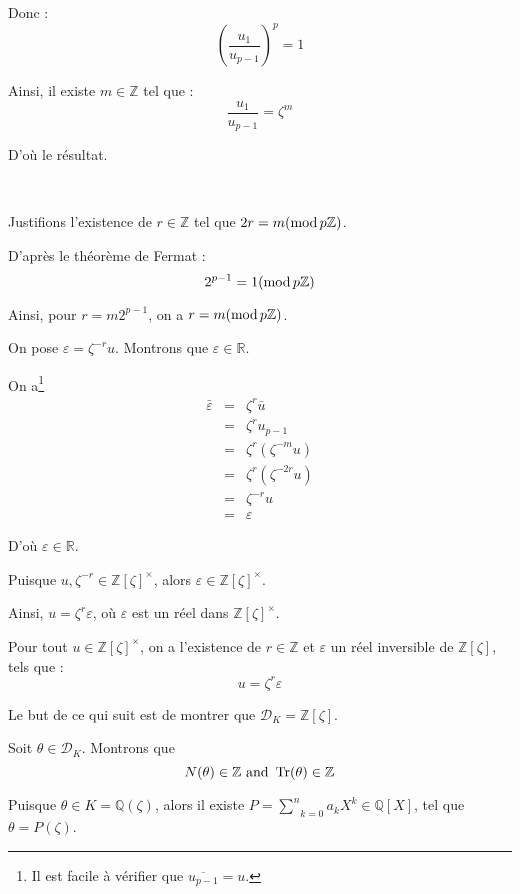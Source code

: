Donc :
\[ \left( \frac{u_1}{u_{p - 1}} \right)^p = 1 \]


Ainsi, il existe $m \in \mathbb{Z}$ tel que :
\[ \frac{u_1}{u_{p - 1}} = \zeta^m \]


D'o{\`u} le r{\'e}sultat.

\

 Justifions l'existence de $r \in \mathbb{Z}$ tel que $2 r = m
(\operatorname{mod} p\mathbb{Z})$.

D'apr{\`e}s le th{\'e}or{\`e}me de Fermat :
\[ 2^{p - 1} = 1 (\operatorname{mod} p\mathbb{Z}) \]


Ainsi, pour $r = m 2^{p - 1}$, on a $r = m (\operatorname{mod} p\mathbb{Z})$.

On pose $\varepsilon = \zeta^{- r} u$. Montrons que $\varepsilon \in
\mathbb{R}$.

On a\footnote{Il est facile {\`a} v{\'e}rifier que $\overline{u_{p - 1}} =
u$.}
\begin{eqnarray*}
  \bar{\varepsilon} & = & \zeta^r \bar{u}\\
  & = & \zeta^r u_{p - 1}\\
  & = & \zeta^r (\zeta^{- m} u)\\
  & = & \zeta^r (\zeta^{- 2 r} u)\\
  & = & \zeta^{- r} u\\
  & = & \varepsilon
\end{eqnarray*}


D'o{\`u} $\varepsilon \in \mathbb{R}$.

Puisque $u, \zeta^{- r} \in \mathbb{Z} [\zeta]^{\times}$, alors $\varepsilon
\in \mathbb{Z} [\zeta]^{\times}$.

Ainsi, $u = \zeta^r \varepsilon$, o{\`u} $\varepsilon$ est un r{\'e}el dans
$\mathbb{Z} [\zeta]^{\times}$.


Pour tout $u \in \mathbb{Z} [\zeta]^{\times}$, on a l'existence de $r \in
\mathbb{Z}$ et $\varepsilon$ un r{\'e}el inversible de $\mathbb{Z} [\zeta] $,
tels que :
\[ u = \zeta^r \varepsilon \]


 Le but de ce qui suit est de montrer que $\mathcal{D}_K
=\mathbb{Z}[\zeta]$.

 Soit $\theta \in \mathcal{D}_K$. Montrons que
\[ N (\theta) \in \mathbb{Z} \text{ and } \operatorname{Tr} (\theta) \in \mathbb{Z} \]


Puisque $\theta \in K =\mathbb{Q} (\zeta)$, alors il existe $P = \underset{k =
0}{\overset{n}{\sum}} a_k X^k \in \mathbb{Q} [X]$, tel que $\theta = P
(\zeta)$.

